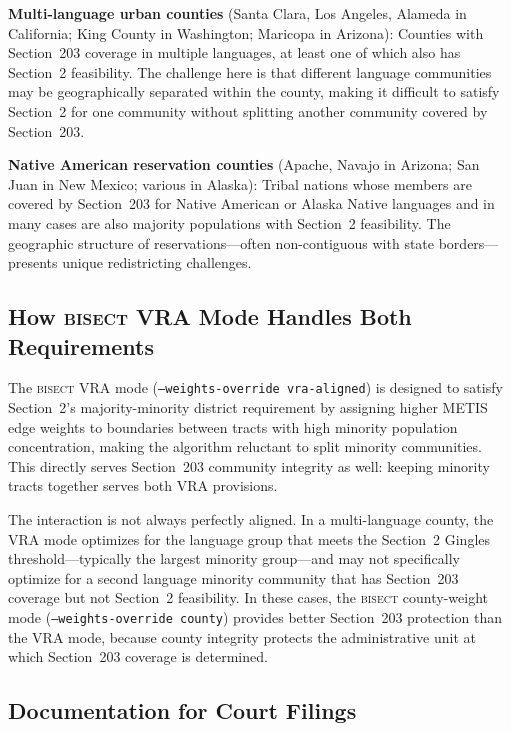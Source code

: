 \textbf{Multi-language urban counties} (Santa Clara, Los Angeles, Alameda
in California; King County in Washington; Maricopa in Arizona): Counties
with Section~203 coverage in multiple languages, at least one of which
also has Section~2 feasibility. The challenge here is that different
language communities may be geographically separated within the county,
making it difficult to satisfy Section~2 for one community without
splitting another community covered by Section~203.

\textbf{Native American reservation counties} (Apache, Navajo in Arizona;
San Juan in New Mexico; various in Alaska): Tribal nations whose members
are covered by Section~203 for Native American or Alaska Native languages
and in many cases are also majority populations with Section~2 feasibility.
The geographic structure of reservations---often non-contiguous with state
borders---presents unique redistricting challenges.

\subsection{How \textsc{bisect} VRA Mode Handles Both Requirements}

The \textsc{bisect} VRA mode (\texttt{--weights-override vra-aligned}) is
designed to satisfy Section~2's majority-minority district requirement by
assigning higher METIS edge weights to boundaries between tracts with high
minority population concentration, making the algorithm reluctant to split
minority communities. This directly serves Section~203 community integrity
as well: keeping minority tracts together serves both VRA provisions.

The interaction is not always perfectly aligned. In a multi-language county,
the VRA mode optimizes for the language group that meets the Section~2
Gingles threshold---typically the largest minority group---and may not
specifically optimize for a second language minority community that has
Section~203 coverage but not Section~2 feasibility. In these cases, the
\textsc{bisect} county-weight mode (\texttt{--weights-override county})
provides better Section~203 protection than the VRA mode, because county
integrity protects the administrative unit at which Section~203 coverage
is determined.

\subsection{Documentation for Court Filings}

